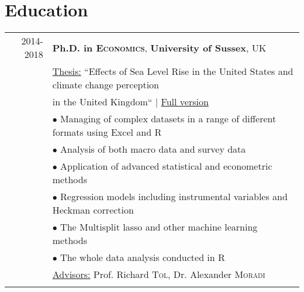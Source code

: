 \documentclass[a4paper,10pt]{article}
\begin{document}
\section{Education}
\begin{tabular}{rl}	
 2014-2018 & \textbf{Ph.D. in \textsc{Economics}}, \textbf{University of Sussex}, UK\\
& \underline{Thesis:} ``Effects of Sea Level Rise in the United States and climate change perception\\

& in the United Kingdom`` \hfill | \href{http://sro.sussex.ac.uk/76891/}{Full version}\\
& \hspace{0.5cm} $\bullet$ Managing of complex datasets in a range of different formats using Excel and R \\
& \hspace{0.5cm} $\bullet$ Analysis of both macro data and survey data\\
& \hspace{0.5cm} $\bullet$ Application of advanced statistical and econometric methods\\
& \hspace{0.5cm} $\bullet$ Regression models including instrumental
variables and Heckman correction\\
& \hspace{0.5cm} $\bullet$ The Multisplit lasso and other machine learning methods\\
& \hspace{0.5cm} $\bullet$ The whole data analysis conducted in R\\


& \underline{Advisors:} Prof. Richard \textsc{Tol}, Dr. Alexander \textsc{Moradi}\\&\\


\end{tabular}



\end{document}
